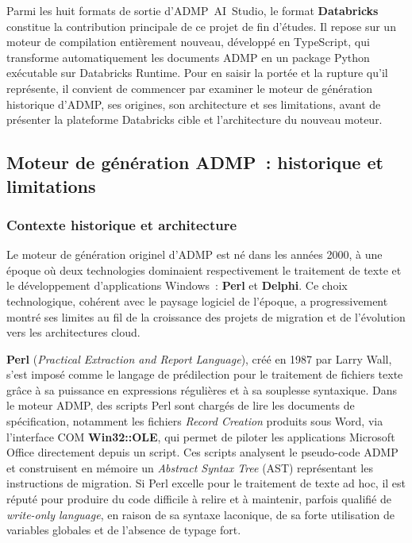 Parmi les huit formats de sortie d'ADMP~AI~Studio, le format \textbf{Databricks} constitue la contribution principale de ce projet de fin d'études. Il repose sur un moteur de compilation entièrement nouveau, développé en TypeScript, qui transforme automatiquement les documents ADMP en un package Python exécutable sur Databricks Runtime. Pour en saisir la portée et la rupture qu'il représente, il convient de commencer par examiner le moteur de génération historique d'ADMP, ses origines, son architecture et ses limitations, avant de présenter la plateforme Databricks cible et l'architecture du nouveau moteur.

\subsection{Moteur de génération ADMP~: historique et limitations}
\label{subsec:moteur-legacy}

\subsubsection*{Contexte historique et architecture}

Le moteur de génération originel d'ADMP est né dans les années 2000, à une époque où deux technologies dominaient respectivement le traitement de texte et le développement d'applications Windows~: \textbf{Perl} et \textbf{Delphi}. Ce choix technologique, cohérent avec le paysage logiciel de l'époque, a progressivement montré ses limites au fil de la croissance des projets de migration et de l'évolution vers les architectures cloud.

\textbf{Perl} (\textit{Practical Extraction and Report Language}), créé en 1987 par Larry Wall, s'est imposé comme le langage de prédilection pour le traitement de fichiers texte grâce à sa puissance en expressions régulières et à sa souplesse syntaxique. Dans le moteur ADMP, des scripts Perl sont chargés de lire les documents de spécification, notamment les fichiers \textit{Record Creation} produits sous Word, via l'interface COM \textbf{Win32::OLE}, qui permet de piloter les applications Microsoft Office directement depuis un script. Ces scripts analysent le pseudo-code ADMP et construisent en mémoire un \textit{Abstract Syntax Tree} (AST) représentant les instructions de migration. Si Perl excelle pour le traitement de texte ad hoc, il est réputé pour produire du code difficile à relire et à maintenir, parfois qualifié de \textit{write-only language}, en raison de sa syntaxe laconique, de sa forte utilisation de variables globales et de l'absence de typage fort.

